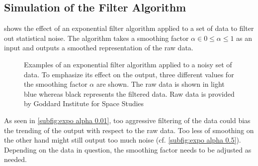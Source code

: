         \subsection{Simulation of the Filter Algorithm}\label{sec:A9 simu of the filter algo}%
             shows the effect of an exponential filter algorithm applied to a set of data to filter
            out statistical noise. The algorithm takes a smoothing factor \(\alpha \in 0 \leq \alpha \leq 1\) as an input and outputs
            a smoothed representation of the raw data.\par 
            \begin{figure}[H]
                \centering
                \subfloat[Exponential filter -- smoothing at \(\alpha = 0.01\).\label{subfig:expo alpha 0.01}]{}
            \end{figure}
            \begin{figure}[H]\ContinuedFloat
                \centering
                \subfloat[Exponential filter -- smoothing at \(\alpha = 0.05\).\label{subfig:expo alpha 0.05}]{}
            \end{figure}
            \begin{figure}[H]\ContinuedFloat
                \centering
                \subfloat[Exponential filter -- smoothing at \(\alpha = 0.5\).\label{subfig:expo alpha 0.5}]{}
                \caption[Examples of an exponential filter algorithm applied to a noisy set of data]{Examples of an exponential
                filter algorithm applied to a noisy set of data. To emphasize its effect on the output, three different values for the smoothing factor \(\alpha\) are shown.
                The raw data is shown in light blue whereas black represents the filtered data. Raw data is provided by Goddard Institute for Space Studies \cite{GISS.nasa.surface.temperature.analysis.20210120}}
                \label{fig:all expo filtered samples}
            \end{figure}
            As seen in \cref{subfig:expo alpha 0.01}, too aggressive filtering of the data could bias the trending of the output
            with respect to the raw data. Too less of smoothing on the other hand might still output too much noise (cf. \cref{subfig:expo alpha 0.5}).
            Depending on the data in question, the smoothing factor needs to be adjusted as needed.
